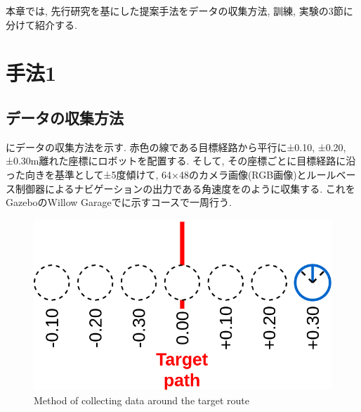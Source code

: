 
本章では, 先行研究を基にした提案手法をデータの収集方法, 訓練, 実験の3節に分けて紹介する.

\section{手法1}

\subsection{データの収集方法}
にデータの収集方法を示す. 赤色の線である目標経路から平行に±0.10, ±0.20, ±0.30m離れた座標にロボットを配置する. そして, その座標ごとに目標経路に沿った向きを基準として±5度傾けて, 64×48のカメラ画像(RGB画像)とルールベース制御器によるナビゲーションの出力である角速度をのように収集する. これをGazebo\cite{gazebo}のWillow Garage\cite{willow}でに示すコースで一周行う.


\begin{figure}[h]
  \centering
  \includegraphics[keepaspectratio, scale=0.25]{images/old-method.png}
  \caption{Method of collecting data around the target route}
  \label{Fig:old-method}
  \end{figure}

